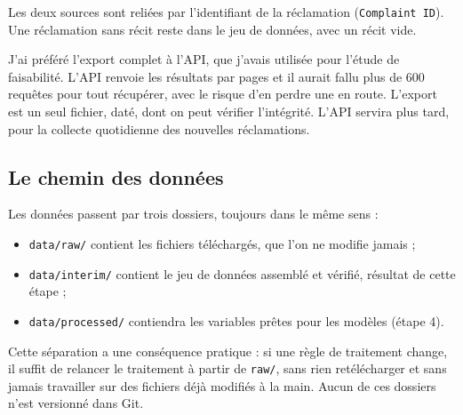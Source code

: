 \documentclass[11pt,a4paper]{article}
\begin{document}
Les deux sources sont reliées par l'identifiant de la réclamation (\texttt{Complaint ID}). Une réclamation sans récit reste dans le jeu de données, avec un récit vide.

J'ai préféré l'export complet à l'API, que j'avais utilisée pour l'étude de faisabilité. L'API renvoie les résultats par pages et il aurait fallu plus de 600 requêtes pour tout récupérer, avec le risque d'en perdre une en route. L'export est un seul fichier, daté, dont on peut vérifier l'intégrité. L'API servira plus tard, pour la collecte quotidienne des nouvelles réclamations.

\subsection{Le chemin des données}

Les données passent par trois dossiers, toujours dans le même sens :

\begin{itemize}
  \item \texttt{data/raw/} contient les fichiers téléchargés, que l'on ne modifie jamais ;
  \item \texttt{data/interim/} contient le jeu de données assemblé et vérifié, résultat de cette étape ;
  \item \texttt{data/processed/} contiendra les variables prêtes pour les modèles (étape 4).
\end{itemize}

Cette séparation a une conséquence pratique : si une règle de traitement change, il suffit de relancer le traitement à partir de \texttt{raw/}, sans rien retélécharger et sans jamais travailler sur des fichiers déjà modifiés à la main. Aucun de ces dossiers n'est versionné dans Git.
\end{document}
